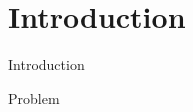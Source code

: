 \section{Introduction}
\begin{frame}{Introduction}{}
\begin{block}{Problem}

\end{block}
\end{frame}

